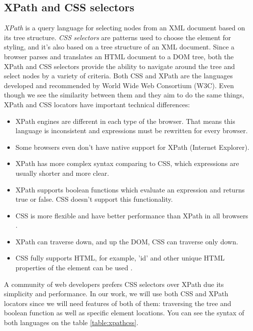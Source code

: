 \subsection{XPath and CSS selectors}
\label{subsec:xpathcss}

\textit{XPath} is a query language for selecting nodes from an XML document based on its tree structure. \textit{CSS selectors} are patterns used to choose the element for styling, and it's also based on a tree structure of an XML document. Since a browser parses and translates an HTML document to a DOM tree, both the XPath and CSS selectors provide the ability to navigate around the tree and select nodes by a variety of criteria. Both CSS and XPath are the languages developed and recommended by World Wide Web Consortium (W3C). Even though we see the similarity between them and they aim to do the same things, XPath and CSS locators have important technical differences:
\begin{itemize}
    \item XPath engines are different in each type of the browser. That means this language is inconsistent and expressions must be rewritten for every browser.  
    \item Some browsers even don't have native support for XPath (Internet Explorer).
    \item XPath has more complex syntax comparing to CSS, which expressions are usually shorter and more clear.
    \item XPath supports boolean functions which evaluate an expression and returns true or false. CSS doesn't support this functionality.
    \item CSS is more flexible and have better performance than XPath in all browsers \cite{SelenSpeed}.
    \item XPath can traverse down, and up the DOM, CSS can traverse only down.
    \item CSS fully supports HTML, for example, 'id' and other unique HTML properties of the element can be used \cite{XpathCssDiff}.
\end{itemize}

A community of web developers prefers CSS selectors over XPath due its simplicity and performance. In our work, we will use both CSS and XPath locators since we will need features of both of them: traversing the tree and boolean function as well as specific element locations. You can see the syntax of both languages on the table \ref{table:xpathcss}.\\

